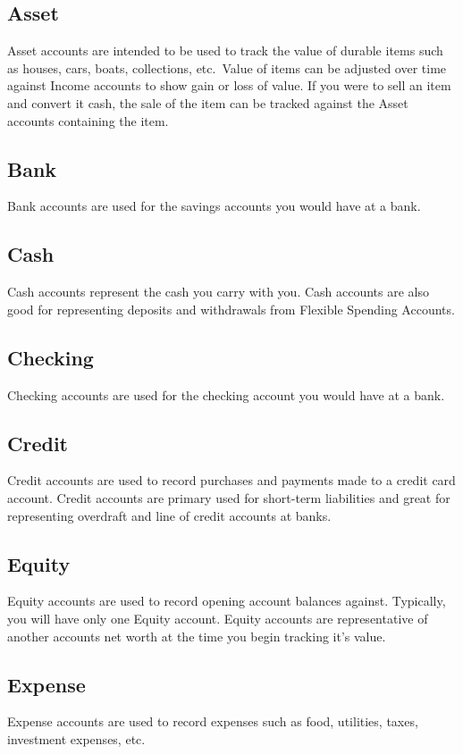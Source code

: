 \documentclass[letterpaper,12pt]{book}
\begin{document}
    \subsection{Asset}
    Asset accounts are intended to be used to track the value of durable items such as houses, cars, boats, collections, etc.\
    Value of items can be adjusted over time against Income accounts to show gain or loss of value.
    If you were to sell an item and convert it cash, the sale of the item can be tracked against the Asset accounts containing the item.

    \subsection{Bank}
    Bank accounts are used for the savings accounts you would have at a bank.

    \subsection{Cash}
    Cash accounts represent the cash you carry with you.
    Cash accounts are also good for representing deposits and withdrawals from Flexible Spending Accounts.

    \subsection{Checking}
    Checking accounts are used for the checking account you would have at a bank.

    \subsection{Credit}
    Credit accounts are used to record purchases and payments made to a credit card account.
    Credit accounts are primary used for short-term liabilities and great for representing overdraft and line of
    credit accounts at banks.

    \subsection{Equity}
    Equity accounts are used to record opening account balances against.
    Typically, you will have only one Equity account.
    Equity accounts are representative of another accounts net worth at the time you begin tracking it's value.

    \subsection{Expense}
    Expense accounts are used to record expenses such as food, utilities, taxes, investment expenses, etc.
\end{document}
